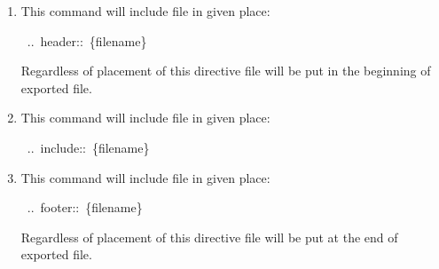 \documentclass[12pt]{article}
\begin{document}
\begin{enumerate}[label=\arabic*.]
\item
This command will include file in given place:

\begin{ttfamily}\begin{flushleft}
\mbox{~..~header::~\{filename\}}\\
\end{flushleft}\end{ttfamily}

 Regardless of placement of this directive file will be put in the
 beginning of exported file.

\item
This command will include file in given place:

\begin{ttfamily}\begin{flushleft}
\mbox{~..~include::~\{filename\}}\\
\end{flushleft}\end{ttfamily}

\item
This command will include file in given place:

\begin{ttfamily}\begin{flushleft}
\mbox{~..~footer::~\{filename\}}\\
\end{flushleft}\end{ttfamily}

 Regardless of placement of this directive file will be put at the end of
 exported file.
\end{enumerate}
\end{document}
